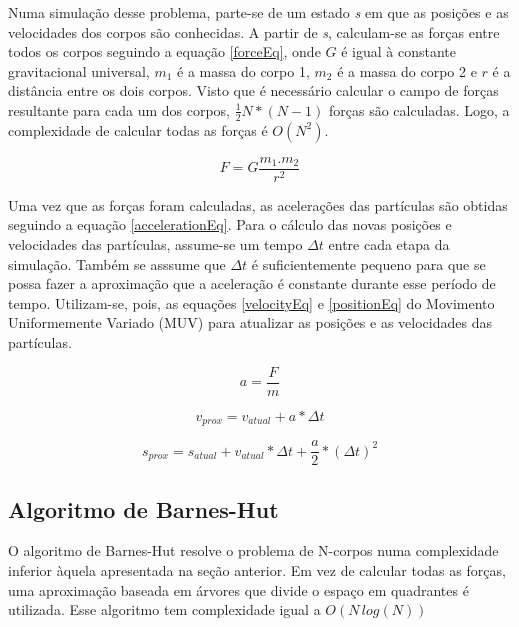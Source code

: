 \documentclass[rel_mlp]{iiufrgs}
\begin{document}
Numa simulação desse problema, parte-se de um estado \textit{s} em que as posições e as velocidades dos corpos são conhecidas. A partir de \textit{s}, calculam-se as forças entre todos os corpos seguindo a equação \ref{forceEq}, onde $G$ é igual à constante gravitacional universal, $m_1$ é a massa do corpo 1, $m_2$ é a massa do corpo 2 e $r$ é a distância entre os dois corpos. Visto que é necessário calcular o campo de forças resultante para cada um dos corpos, $\frac{1}{2}N*(N-1)$ forças são calculadas. Logo, a complexidade de calcular todas as forças é $O(N^2)$.

\begin{equation}
\label{forceEq}
F=G\frac{m_1.m_2}{r^2}
\end{equation}

Uma vez que as forças foram calculadas, as acelerações das partículas são obtidas seguindo a equação \ref{accelerationEq}. Para o cálculo das novas posições e velocidades das partículas, assume-se um tempo $\Delta t$ entre cada etapa da simulação. Também se asssume que $\Delta t$ é suficientemente pequeno para que se possa fazer a aproximação que a aceleração é constante durante esse período de tempo. Utilizam-se, pois, as equações \ref{velocityEq} e \ref{positionEq} do Movimento Uniformemente Variado (MUV) para atualizar as posições e as velocidades das partículas.

\begin{equation}
\label{accelerationEq}
a=\frac{F}{m}
\end{equation}

\begin{equation}
\label{velocityEq}
v_{prox} = v_{atual} + a*\Delta t
\end{equation}

\begin{equation}
\label{positionEq}
s_{prox} = s_{atual} + v_{atual}*\Delta t + \frac{a}{2}*(\Delta t)^2
\end{equation}

\subsection{Algoritmo de Barnes-Hut}

O algoritmo de Barnes-Hut resolve o problema de N-corpos numa complexidade inferior àquela apresentada na seção anterior. Em vez de calcular todas as forças, uma aproximação baseada em árvores que divide o espaço em quadrantes é utilizada. Esse algoritmo tem complexidade igual a $O(N\,log(N))$
\end{document}

